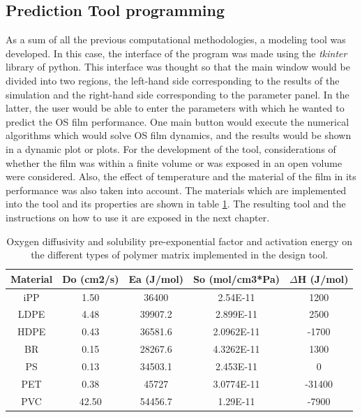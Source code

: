 \begin{refsection}
\subsection{Prediction Tool programming}\label{sec:metodologia_interfaz}
As a sum of all the previous computational methodologies, a modeling tool was developed. In this case, the interface of the program was made using the \textit{tkinter} library of python. This interface was thought so that the main window would be divided into two regions, the left-hand side corresponding to the results of the simulation and the right-hand side corresponding to the parameter panel. In the latter, the user would be able to enter the parameters with which he wanted to predict the OS film performance. One main button would execute the numerical algorithms which would solve OS film dynamics, and the results would be shown in a dynamic plot or plots. For the development of the tool, considerations of whether the film was within a finite volume or was exposed in an open volume were considered. Also, the effect of temperature and the material of the film in its performance was also taken into account.  The materials which are implemented into the tool and its properties are shown in table \ref{tab:materiales_herramienta}. The resulting tool and the instructions on how to use it are exposed in the next chapter.

\begin{table}[H]
\centering
\caption{Oxygen diffusivity and solubility pre-exponential factor and activation energy on the different types of polymer matrix implemented in the design tool.}
\label{tab:materiales_herramienta}

\begin{tabular}{|c|c|c|c|c|}
\hline
Material & Do (cm2/s) & Ea (J/mol) & So (mol/cm3*Pa) & $\Delta$H (J/mol) \\ \hline
iPP      & 1.50       & 36400      & 2.54E-11        & 1200             \\ \hline
LDPE     & 4.48       & 39907.2    & 2.899E-11       & 2500             \\ \hline
HDPE     & 0.43       & 36581.6    & 2.0962E-11      & -1700            \\ \hline
BR       & 0.15       & 28267.6    & 4.3262E-11      & 1300             \\ \hline
PS       & 0.13       & 34503.1    & 2.453E-11       & 0                \\ \hline
PET      & 0.38       & 45727      & 3.0774E-11      & -31400           \\ \hline
PVC      & 42.50      & 54456.7    & 1.29E-11        & -7900            \\ \hline
\end{tabular}%
\end{table}










\printbibliography
\end{refsection}